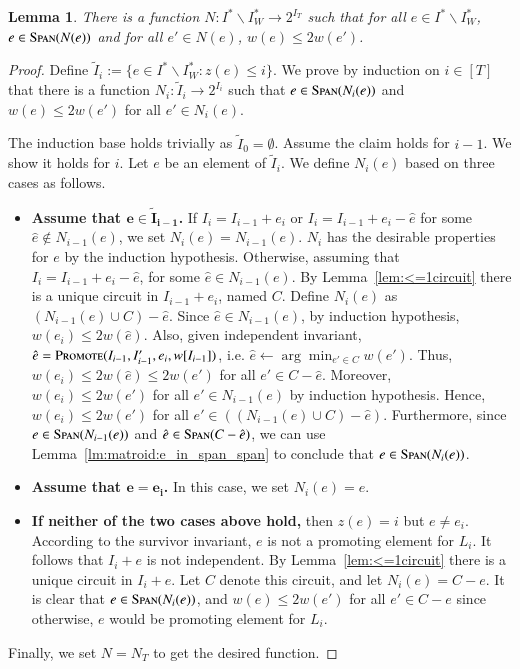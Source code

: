 \documentclass[11pt]{article}
\newtheorem{lemma}[theorem]{Lemma}
\newcommand{\wtilde}{\widetilde}
\newcommand{\replacementTester}{\textsc{Promote}}
\newcommand{\spn}{{\textsc{Span}}}
\begin{document}
\begin{lemma}\label{lm:hall}
  There is a function 
  $N: I^* \backslash I^*_{W} \to 2^{I_T}$ such that
  for all $e \in I^* \backslash I^*_{W}$, $e \in \spn(N(e))$ and  
  for all $e' \in N(e)$,
  $w(e) \le 2w(e')$.
\end{lemma}
\begin{proof}
  Define
  \begin{math}
      \wtilde{I}_i := \{e \in I^* \backslash I^*_{W}: z(e) \le i\}.
  \end{math}
  We prove by induction on $i \in [T]$ that there is 
  a function $N_i: \wtilde{I}_i \to 2^{I_i}$ such that
  $e \in \spn(N_i(e))$ and  
  $w(e) \le 2w(e')$ for all $e' \in N_i(e)$.
  
  The induction base holds trivially as $\wtilde{I}_0 = \emptyset$. Assume the claim holds for $i-1$. We show it holds for $i$.
  Let $e$ be an element of
  $\wtilde{I}_i$. We define $N_i(e)$ based on three cases as follows.
 
  \begin{itemize}
      \item \textbf{Assume that
      $\mathbf{e \in \wtilde{I}_{i-1}}$.} 
      If $I_i = I_{i-1} + e_i$ or $I_{i} = I_{i-1} + e_i - \hat{e}$ for some $\hat{e} \notin N_{i-1}(e)$, we set
      $N_i(e) = N_{i-1}(e)$.
      $N_i$ has the desirable properties for $e$ by the induction hypothesis.
      Otherwise, assuming that
      $I_{i} = I_{i-1} + e_i - \hat{e}$,  for some $\hat{e} \in N_{i-1}(e)$.
      By Lemma~\ref{lem:<=1circuit} there is a unique circuit in $I_{i-1} + e_i$, named $C$. 
      Define $N_i(e)$ as $(N_{i -1}(e) \cup C) - \hat{e} $.
      Since $\hat{e} \in N_{i-1}(e)$, by induction hypothesis, $w(e_i) \le 2w(\hat{e})$.
      Also, given independent invariant, $\hat{e} = \replacementTester{}(I_{i-1}, I'_{i-1}, e_i, w[I_{i-1}])$, i.e. $\hat{e} \gets \arg\min_{e' \in C} w(e')$. Thus,
      $w(e_i) \le 2w(\hat{e}) \le 2w(e')$ for all $e' \in C - \hat{e}$. Moreover, $w(e_i) \le 2w(e')$ for all $e' \in N_{i-1}(e)$ by induction hypothesis. Hence, $w(e_i) \le 2w(e')$ for all $e' \in \left( \left( N_{i -1}(e) \cup C \right) - \hat{e} \right)$.
      Furthermore, since $e \in \spn(N_{i-1}(e))$ and $\hat{e} \in \spn(C - \hat{e})$, we can use Lemma~\ref{lm:matroid:e_in_span_span} to conclude that
      $e \in \spn(N_{i}(e))$. 
      \item \textbf{Assume that $\mathbf{e = e_i}$.} 
      In this case, we set $N_i(e) = e$.
      \item \textbf{If neither of the two cases above hold,}
      then $z(e)=i$ but $e\neq e_i$.
      According to the survivor invariant, $e$ is not a promoting element for $L_i$.
      It follows that
      $I_i+e$ is not independent.
      By Lemma~\ref{lem:<=1circuit} there is a unique circuit in $I_i + e$. 
      Let $C$ denote this circuit, and let $N_i(e) = C - e$. It is clear that $e \in \spn(N_i(e))$, and $w(e) \le 2w(e')$ for all $e' \in C - e$ since otherwise, $e$ would be promoting element for $L_i$.
  \end{itemize}
  Finally, we set $N = N_T$ to get the desired function.
\end{proof}
\end{document}
